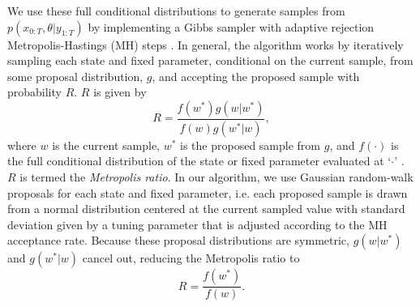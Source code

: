 We use these full conditional distributions to generate samples from $p(x_{0:T},\theta|y_{1:T})$ by implementing a Gibbs sampler with adaptive rejection Metropolis-Hastings (MH) steps \citep{Metr:Rose:Rose:Tell:Tell:equa:1953, Hast:mont:1970,  Gema:Gema:stoc:1984, gilks1995adaptive}. In general, the algorithm works by iteratively sampling each state and fixed parameter, conditional on the current sample, from some proposal distribution, $g$, and accepting the proposed sample with probability $R$. $R$ is given by
\begin{equation}
R = \frac{f(w^*)g(w|w^*)}{f(w)g(w^*|w)}, \label{eqn:mhrat}
\end{equation}
where $w$ is the current sample, $w^*$ is the proposed sample from $g$, and $f(\cdot)$ is the full conditional distribution of the state or fixed parameter evaluated at `$\cdot$' \cite[Chapter 7][]{giv:hoet:2005:comp}. $R$ is termed the \emph{Metropolis ratio}. In our algorithm, we use Gaussian random-walk proposals for each state and fixed parameter, i.e. each proposed sample is drawn from a normal distribution centered at the current sampled value with standard deviation given by a tuning parameter that is adjusted according to the MH acceptance rate. Because these proposal distributions are symmetric, $g(w|w^*)$ and $g(w^*|w)$ cancel out, reducing the Metropolis ratio to
\begin{equation}
R = \frac{f(w^*)}{f(w)}. \label{eqn:mhrat:reduce}
\end{equation}

